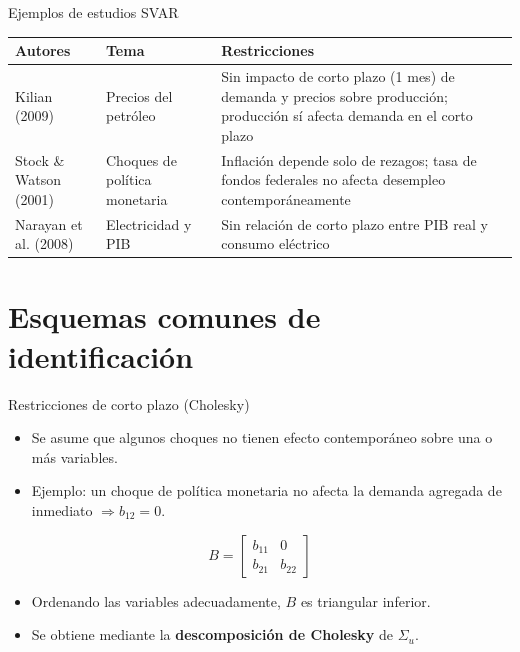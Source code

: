 \documentclass[11pt]{beamer}
\begin{document}
\begin{frame}{Ejemplos de estudios SVAR}
\small
\begin{tabular}{p{2.3cm}p{2.6cm}p{5.5cm}}
\toprule
\textbf{Autores} & \textbf{Tema} & \textbf{Restricciones} \\
\midrule
Kilian (2009) & Precios del petróleo & Sin impacto de corto plazo (1 mes) de demanda y precios sobre producción; producción sí afecta demanda en el corto plazo \\
Stock \& Watson (2001) & Choques de política monetaria & Inflación depende solo de rezagos; tasa de fondos federales no afecta desempleo contemporáneamente \\
Narayan et al. (2008) & Electricidad y PIB & Sin relación de corto plazo entre PIB real y consumo eléctrico \\
\bottomrule
\end{tabular}
\end{frame}

\section{Esquemas comunes de identificación}

\begin{frame}{Restricciones de corto plazo (Cholesky)}
\begin{itemize}
    \item Se asume que algunos choques no tienen efecto contemporáneo sobre una o más variables.
    \item Ejemplo: un choque de política monetaria no afecta la demanda agregada de inmediato $\Rightarrow b_{12}=0$.
\end{itemize}

\[
B = \begin{bmatrix} b_{11} & 0 \\ b_{21} & b_{22} \end{bmatrix}
\]

\begin{itemize}
    \item Ordenando las variables adecuadamente, $B$ es triangular inferior.
    \item Se obtiene mediante la \textbf{descomposición de Cholesky} de $\Sigma_u$.
\end{itemize}
\end{frame}
\end{document}
